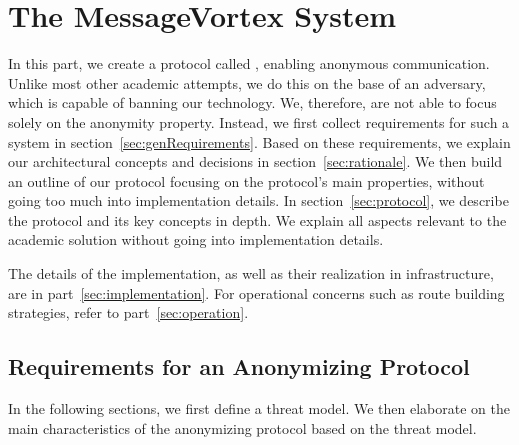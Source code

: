 

\part{The  MessageVortex System}
In this part, we create a protocol called \MessageVortex{}, enabling anonymous communication. Unlike most other academic attempts, we do this on the base of an adversary, which is capable of banning our technology. We, therefore, are not able to focus solely on the anonymity property. Instead, we first collect requirements for such a system in section~\ref{sec:genRequirements}. Based on these requirements, we explain our architectural concepts and decisions in section~\ref{sec:rationale}. We then build an outline of our protocol focusing on the protocol's main properties, without going too much into implementation details. In section~\ref{sec:protocol}, we describe the protocol and its key concepts in depth. We explain all aspects relevant to the academic solution without going into implementation details.

The details of the implementation, as well as their realization in infrastructure, are in part~\ref{sec:implementation}. For operational concerns such as route building strategies, refer to part~\ref{sec:operation}.

\chapter{Requirements for an Anonymizing Protocol\label{sec:genRequirements}}
In the following sections, we first define a threat model. We then elaborate on the main characteristics of the anonymizing protocol based on the threat model. 

